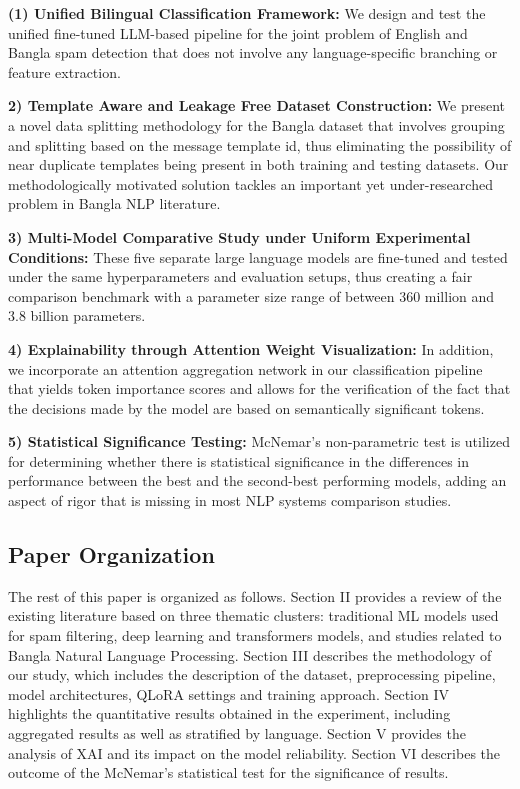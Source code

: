 \documentclass[journal]{IEEEtran}
\begin{document}
\textbf{(1) Unified Bilingual Classification Framework:} We design and test
the unified fine-tuned LLM-based pipeline for the joint problem of
English and Bangla spam detection that does not involve any
language-specific branching or feature extraction.

\textbf{2) Template Aware and Leakage Free Dataset Construction:} We present
a novel data splitting methodology for the Bangla dataset that involves
grouping and splitting based on the message template id, thus
eliminating the possibility of near duplicate templates being present in
both training and testing datasets. Our methodologically motivated
solution tackles an important yet under-researched problem in Bangla NLP
literature.

\textbf{3) Multi-Model Comparative Study under Uniform Experimental
Conditions:} These five separate large language models are fine-tuned
and tested under the same hyperparameters and evaluation setups, thus
creating a fair comparison benchmark with a parameter size range of
between 360 million and 3.8 billion parameters.

\textbf{4) Explainability through Attention Weight Visualization:} In
addition, we incorporate an attention aggregation network in our
classification pipeline that yields token importance scores and allows
for the verification of the fact that the decisions made by the model
are based on semantically significant tokens.

\textbf{5) Statistical Significance Testing:} McNemar's non-parametric test
is utilized for determining whether there is statistical significance in
the differences in performance between the best and the second-best
performing models, adding an aspect of rigor that is missing in most NLP
systems comparison studies.

\subsection{Paper Organization}

The rest of this paper is organized as follows. Section II provides a
review of the existing literature based on three thematic clusters:
traditional ML models used for spam filtering, deep learning and
transformers models, and studies related to Bangla Natural Language
Processing. Section III describes the methodology of our study, which
includes the description of the dataset, preprocessing pipeline, model
architectures, QLoRA settings and training approach. Section IV
highlights the quantitative results obtained in the experiment,
including aggregated results as well as stratified by language. Section
V provides the analysis of XAI and its impact on the model reliability.
Section VI describes the outcome of the McNemar's statistical test for
the significance of results.
\end{document}
